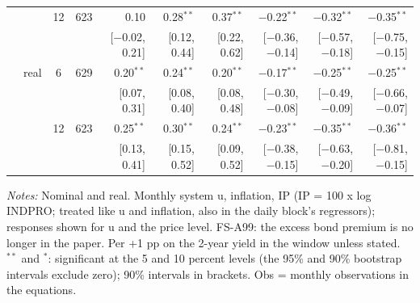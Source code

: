 \begin{longtable}{llcrrrrrrr}
 &  & 12 & 623 & 0.10 & 0.28$^{**}$ & 0.37$^{**}$ & $-$0.22$^{**}$ & $-$0.32$^{**}$ & $-$0.35$^{**}$\\
 & & & & {\scriptsize [$-$0.02, 0.21]} & {\scriptsize [0.12, 0.44]} & {\scriptsize [0.22, 0.62]} & {\scriptsize [$-$0.36, $-$0.14]} & {\scriptsize [$-$0.57, $-$0.18]} & {\scriptsize [$-$0.75, $-$0.15]}\\
 & real & 6 & 629 & 0.20$^{**}$ & 0.24$^{**}$ & 0.20$^{**}$ & $-$0.17$^{**}$ & $-$0.25$^{**}$ & $-$0.25$^{**}$\\
 & & & & {\scriptsize [0.07, 0.31]} & {\scriptsize [0.08, 0.40]} & {\scriptsize [0.08, 0.48]} & {\scriptsize [$-$0.30, $-$0.08]} & {\scriptsize [$-$0.49, $-$0.09]} & {\scriptsize [$-$0.66, $-$0.07]}\\
 &  & 12 & 623 & 0.25$^{**}$ & 0.30$^{**}$ & 0.24$^{**}$ & $-$0.23$^{**}$ & $-$0.35$^{**}$ & $-$0.36$^{**}$\\
 & & & & {\scriptsize [0.13, 0.41]} & {\scriptsize [0.15, 0.52]} & {\scriptsize [0.09, 0.52]} & {\scriptsize [$-$0.38, $-$0.15]} & {\scriptsize [$-$0.63, $-$0.20]} & {\scriptsize [$-$0.81, $-$0.15]}\\
\end{longtable}
\begin{flushleft}\footnotesize\textit{Notes:} Nominal and real. Monthly system u, inflation, IP (IP = 100 x log INDPRO; treated like u and inflation, also in the daily block's regressors); responses shown for u and the price level. FS-A99: the excess bond premium is no longer in the paper. Per +1 pp on the 2-year yield in the window unless stated. $^{**}$ and $^{*}$: significant at the 5 and 10 percent levels (the 95\% and 90\% bootstrap intervals exclude zero); 90\% intervals in brackets. Obs = monthly observations in the equations.\end{flushleft}
\endgroup

